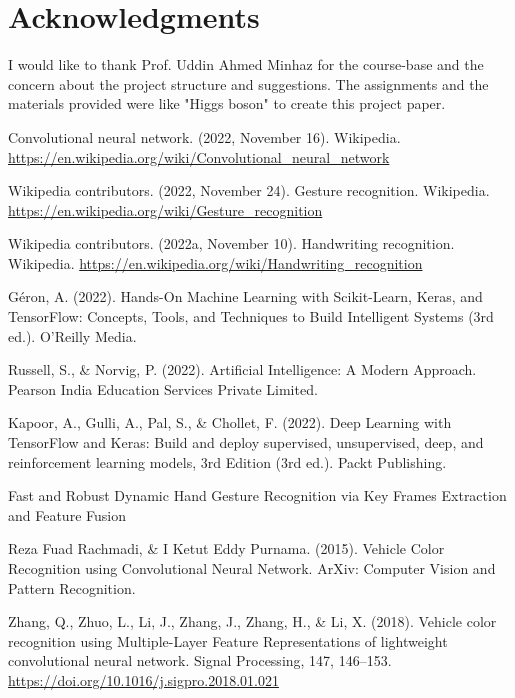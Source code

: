 \documentclass[letterpaper, 10 pt, conference]{ieeeconf}  %
\begin{document}
\newpage
\section*{Acknowledgments}

I would like to thank Prof. Uddin Ahmed Minhaz for the course-base and the concern about the project structure and suggestions. The assignments and the materials provided were like "Higgs boson" to create this project paper.




\begin{thebibliography}{99}

 Convolutional neural network. (2022, November 16). Wikipedia. \url{https://en.wikipedia.org/wiki/Convolutional\_neural\_network}

 Wikipedia contributors. (2022, November 24). Gesture recognition. Wikipedia. \url{https://en.wikipedia.org/wiki/Gesture\_recognition}

 Wikipedia contributors. (2022a, November 10). Handwriting recognition. Wikipedia. \url{https://en.wikipedia.org/wiki/Handwriting\_recognition}

 Géron, A. (2022). Hands-On Machine Learning with Scikit-Learn, Keras, and TensorFlow: Concepts, Tools, and Techniques to Build Intelligent Systems (3rd ed.). O’Reilly Media.

 Russell, S., \& Norvig, P. (2022). Artificial Intelligence: A Modern Approach. Pearson India Education Services Private Limited.

 Kapoor, A., Gulli, A., Pal, S., \& Chollet, F. (2022). Deep Learning with TensorFlow and Keras: Build and deploy supervised, unsupervised, deep, and reinforcement learning models, 3rd Edition (3rd ed.). Packt Publishing.

 Fast and Robust Dynamic Hand Gesture Recognition via
Key Frames Extraction and Feature Fusion

 Reza Fuad Rachmadi, \& I Ketut Eddy Purnama. (2015). Vehicle Color Recognition using Convolutional Neural Network. ArXiv: Computer Vision and Pattern Recognition.

 Zhang, Q., Zhuo, L., Li, J., Zhang, J., Zhang, H., \& Li, X. (2018). Vehicle color recognition using Multiple-Layer Feature Representations of lightweight convolutional neural network. Signal Processing, 147, 146–153. \url{https://doi.org/10.1016/j.sigpro.2018.01.021}


\end{thebibliography}
\end{document}
